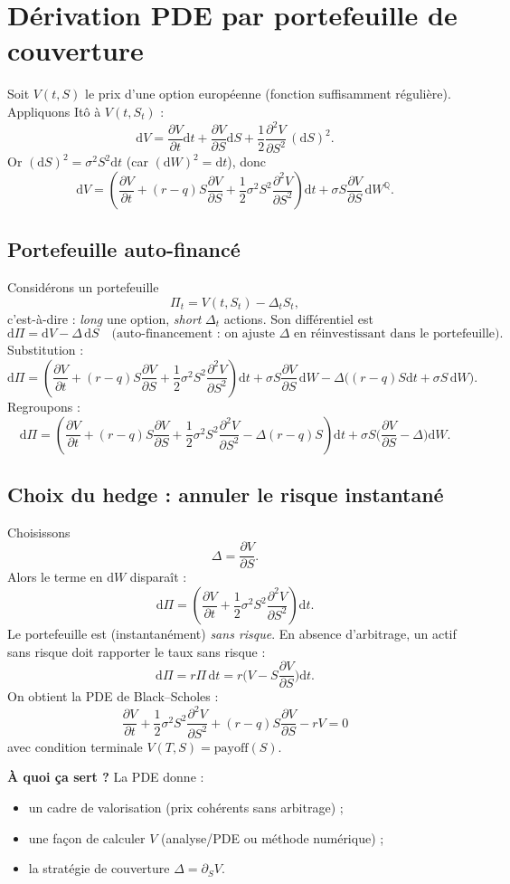 \documentclass[11pt,a4paper]{report}
\newcommand{\dd}{\mathrm{d}}
\newcommand{\Q}{\mathbb{Q}}
\newcommand{\1}{\mathbbm{1}}
\newcommand{\pd}[2]{\frac{\partial #1}{\partial #2}}
\newcommand{\pdd}[2]{\frac{\partial^2 #1}{\partial #2^2}}
\theoremstyle{definition}
\theoremstyle{plain}
\theoremstyle{remark}
\begin{document}
\section{Dérivation PDE par portefeuille de couverture}
\label{sec:derive_pde}

Soit $V(t,S)$ le prix d'une option européenne (fonction suffisamment régulière).
Appliquons Itô à $V(t,S_t)$ :
\[
\dd V
=
\pd{V}{t}\dd t + \pd{V}{S}\dd S + \frac12 \pdd{V}{S}\,(\dd S)^2.
\]
Or $(\dd S)^2 = \sigma^2 S^2 \dd t$ (car $(\dd W)^2=\dd t$), donc
\[
\dd V
=
\left(\pd{V}{t} + (r-q)S\pd{V}{S} + \frac12\sigma^2 S^2 \pdd{V}{S}\right)\dd t
+ \sigma S \pd{V}{S}\,\dd W^{\Q}.
\]

\subsection{Portefeuille auto-financé}
Considérons un portefeuille
\[
\Pi_t = V(t,S_t) - \Delta_t S_t,
\]
c'est-à-dire : \emph{long} une option, \emph{short} $\Delta_t$ actions.
Son différentiel est
\[
\dd \Pi = \dd V - \Delta\,\dd S \quad \text{(auto-financement : on ajuste $\Delta$ en réinvestissant dans le portefeuille).}
\]
Substitution :
\[
\dd \Pi
=
\left(\pd{V}{t} + (r-q)S\pd{V}{S} + \frac12\sigma^2 S^2 \pdd{V}{S}\right)\dd t
+ \sigma S \pd{V}{S}\,\dd W
- \Delta\bigl((r-q)S\dd t + \sigma S\,\dd W\bigr).
\]
Regroupons :
\[
\dd \Pi
=
\left(\pd{V}{t} + (r-q)S\pd{V}{S} + \frac12\sigma^2 S^2 \pdd{V}{S} - \Delta (r-q)S\right)\dd t
+ \sigma S\bigl(\pd{V}{S} - \Delta\bigr)\dd W.
\]

\subsection{Choix du hedge : annuler le risque instantané}
Choisissons
\[
\Delta = \pd{V}{S}.
\]
Alors le terme en $\dd W$ disparaît :
\[
\dd \Pi
=
\left(\pd{V}{t} + \frac12\sigma^2 S^2 \pdd{V}{S}\right)\dd t.
\]
Le portefeuille est (instantanément) \emph{sans risque}.
En absence d'arbitrage, un actif sans risque doit rapporter le taux sans risque :
\[
\dd \Pi = r \Pi\,\dd t = r\bigl(V - S\pd{V}{S}\bigr)\dd t.
\]
On obtient la PDE de Black--Scholes :
\[
\boxed{
\pd{V}{t} + \frac12\sigma^2 S^2 \pdd{V}{S} + (r-q)S\pd{V}{S} - rV = 0
}
\]
avec condition terminale $V(T,S)=\text{payoff}(S)$.

\textbf{À quoi ça sert ?}
La PDE donne :
\begin{itemize}
  \item un cadre de valorisation (prix cohérents sans arbitrage) ;
  \item une façon de calculer $V$ (analyse/PDE ou méthode numérique) ;
  \item la stratégie de couverture $\Delta=\partial_S V$.
\end{itemize}
\end{document}
